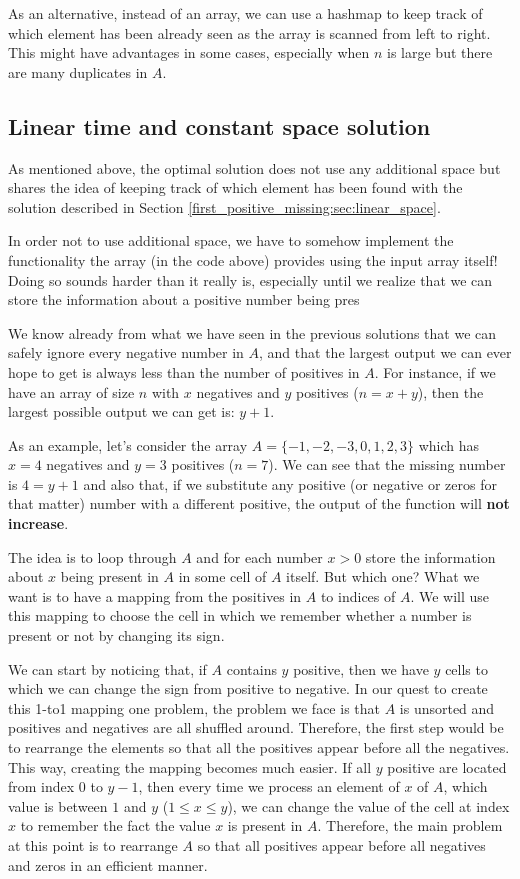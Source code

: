 As an alternative, instead of an array, we can use a hashmap to keep track of which element has
been already seen as the array is scanned from left to right. This might have advantages in some cases, especially when $n$ is large but there are many duplicates in $A$. 


\subsection{Linear time and constant space solution}
\label{first_positive_missing:sec:constant_space}

As mentioned above, the optimal solution does not use any additional space but shares the idea of keeping track of which
element has been found with the solution described in Section \ref{first_positive_missing:sec:linear_space}. 

In order not to use additional space, we have to somehow implement the functionality the array  (in the code above) provides using the input array itself! Doing so sounds harder than it really is, especially until we realize that we can store the information about a positive number being pres

We know already from what we have seen in the previous solutions that we can safely ignore every negative number in $A$, and that the largest output we can ever hope to get is always less than the number of positives in $A$. For instance, if we have an array of size $n$ with $x$ negatives and $y$ positives ($n=x+y$), then the largest possible output we can get is: $y+1$. 

As an example, let's consider the array $A=\{-1, -2, -3, 0, 1, 2, 3\}$ which has $x=4$ negatives and $y=3$ positives ($n=7$). We can see that the missing number is $4=y+1$ and also that, if we substitute any positive (or negative or zeros for that matter) number with a different positive, the output of the function will \textbf{not increase}. 

The idea is to loop through $A$ and for each number $x>0$ store the information about $x$ being present in $A$ in some cell of $A$ itself. But which one? What we want is to have a mapping from the positives in $A$ to indices of $A$. We will use this mapping to choose the cell in which we remember whether a number is present or not by changing its sign.

We can start by noticing that, if $A$ contains $y$ positive, then we have $y$ cells to which we can change the sign from positive to negative. In our quest to create this 1-to1 mapping one problem, the problem we face is that $A$ is unsorted and positives and negatives are all shuffled around. Therefore, the first step would be to rearrange the elements so that all the positives appear before all the negatives. This way, creating the mapping becomes much easier. If all $y$ positive are located from index $0$ to $y-1$, then every time we process an element of $x$ of $A$, which value is between $1$ and $y$ ($1 \leq x \leq y$), we can change the value of the cell at index $x$ to remember the fact the value $x$ is present in $A$. Therefore, the main problem at this point is to rearrange $A$ so that all positives appear before all negatives and zeros in an efficient manner.


